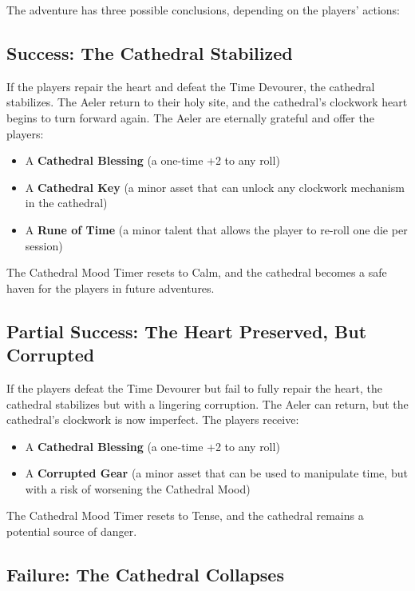 \documentclass{article}
\begin{document}
The adventure has three possible conclusions, depending on the players' actions:

\subsection{Success: The Cathedral Stabilized}

If the players repair the heart and defeat the Time Devourer, the cathedral stabilizes. The Aeler return to their holy site, and the cathedral's clockwork heart begins to turn forward again. The Aeler are eternally grateful and offer the players:

\begin{itemize}
    \item A \textbf{Cathedral Blessing} (a one-time +2 to any roll)
    \item A \textbf{Cathedral Key} (a minor asset that can unlock any clockwork mechanism in the cathedral)
    \item A \textbf{Rune of Time} (a minor talent that allows the player to re-roll one die per session)
\end{itemize}

The Cathedral Mood Timer resets to Calm, and the cathedral becomes a safe haven for the players in future adventures.

\subsection{Partial Success: The Heart Preserved, But Corrupted}

If the players defeat the Time Devourer but fail to fully repair the heart, the cathedral stabilizes but with a lingering corruption. The Aeler can return, but the cathedral's clockwork is now imperfect. The players receive:

\begin{itemize}
    \item A \textbf{Cathedral Blessing} (a one-time +2 to any roll)
    \item A \textbf{Corrupted Gear} (a minor asset that can be used to manipulate time, but with a risk of worsening the Cathedral Mood)
\end{itemize}

The Cathedral Mood Timer resets to Tense, and the cathedral remains a potential source of danger.

\subsection{Failure: The Cathedral Collapses}
\end{document}
